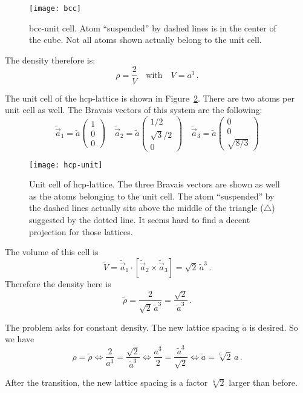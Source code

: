 \documentclass[11pt, english, fleqn, DIV=15, headinclude, BCOR=1cm]{scrartcl}
\begin{document}
\begin{figure}[htbp]
    \centering
    \texttt{[image: bcc]}
    \caption{%
        bcc-unit cell. Atom “suspended” by dashed lines is in the center of the
        cube. Not all atoms shown actually belong to the unit cell.
    }
    \label{fig:bcc}
\end{figure}

The density therefore is:
\[
    \rho = \frac{2}{V}
    \quad\text{with}\quad
    V = a^3 \,.
\]

The unit cell of the hcp-lattice is shown in Figure~\ref{fig:hcp-unit}. There
are two atoms per unit cell as well. The Bravais vectors of this system are the
following:
\[
    \tilde{\vec a}_1 =
    \tilde a
    \begin{pmatrix}
        1 \\ 0 \\ 0
    \end{pmatrix}
    \quad
    \tilde{\vec a}_2 =
    \tilde a
    \begin{pmatrix}
        1/2 \\ \sqrt{3}/2 \\ 0
    \end{pmatrix}
    \quad
    \tilde{\vec a}_3 =
    \tilde a
    \begin{pmatrix}
        0 \\ 0 \\ \sqrt{8/3}
    \end{pmatrix}
\]

\begin{figure}[htbp]
    \centering
    \texttt{[image: hcp-unit]}
    \caption{%
        Unit cell of hcp-lattice. The three Bravais vectors are shown as well
        as the atoms belonging to the unit cell. The atom “suspended” by the
        dashed lines actually sits above the middle of the triangle
        ($\bigtriangleup$) suggested by the dotted line. It seems hard to find
        a decent projection for those lattices.
    }
    \label{fig:hcp-unit}
\end{figure}

The volume of this cell is
\[
    \tilde V = \tilde{\vec a}_1 \cdot [\tilde{\vec a}_2 \times \tilde{\vec
    a}_3] = \sqrt 2 \, \tilde a^3 \,.
\]
Therefore the density here is
\[
    \tilde \rho
    = \frac{2}{\sqrt 2 \, \tilde a^3}
    = \frac{\sqrt 2}{\tilde a^3} \,.
\]

The problem asks for constant density. The new lattice spacing $\tilde a$ is
desired. So we have
\[
    \rho = \tilde \rho
    \iff
    \frac{2}{a^3} = \frac{\sqrt 2}{\tilde a^3}
    \iff
    \frac{a^3}{2} = \frac{\tilde a^3}{\sqrt 2}
    \iff
    \tilde a
    =
    \sqrt[6] 2 \, a
    \,.
\]

After the transition, the new lattice spacing is a factor $\sqrt[6] 2$ larger
than before.
\end{document}
